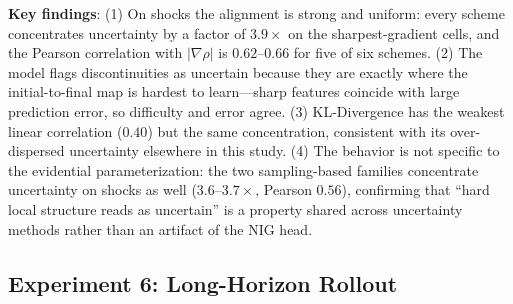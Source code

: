 \begin{table}[htbp]
\centering
\caption{Shock capturing: alignment of predicted uncertainty with $|\nabla \rho|$ on 2D
compressible Euler. Concentration ratio $\gg 1$ means uncertainty localizes on shocks.}
\label{tab:shock}
\end{table}

\textbf{Key findings}: (1) On shocks the alignment is strong and uniform: every scheme concentrates
uncertainty by a factor of $3.9\times$ on the sharpest-gradient cells, and the Pearson correlation
with $|\nabla \rho|$ is $0.62$--$0.66$ for five of six schemes. (2) The model flags discontinuities
as uncertain because they are exactly where the initial-to-final map is hardest to learn---sharp
features coincide with large prediction error, so difficulty and error agree. (3) KL-Divergence has
the weakest linear correlation ($0.40$) but the same concentration, consistent with its
over-dispersed uncertainty elsewhere in this study. (4) The behavior is not specific to the
evidential parameterization: the two sampling-based families concentrate uncertainty on shocks as
well ($3.6$--$3.7\times$, Pearson $0.56$), confirming that ``hard local structure reads as
uncertain'' is a property shared across uncertainty methods rather than an artifact of the NIG head.

\subsection{Experiment 6: Long-Horizon Rollout}
\label{sec:exp_rollout}

